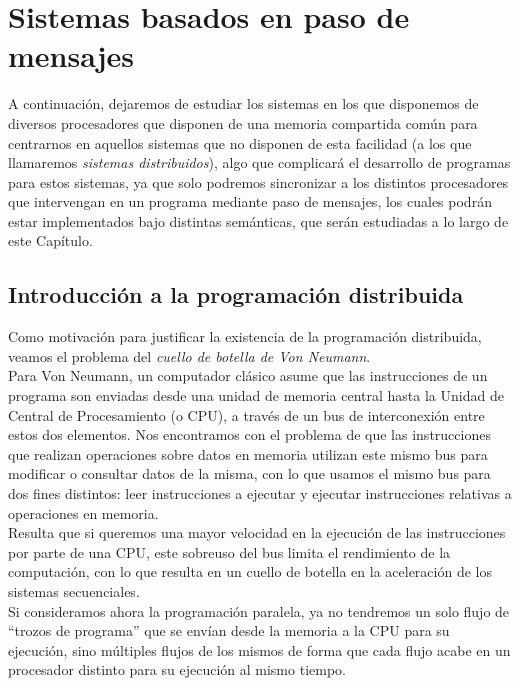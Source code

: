 \chapter{Sistemas basados en paso de mensajes}

A continuación, dejaremos de estudiar los sistemas en los que disponemos de diversos procesadores que disponen de una memoria compartida común para centrarnos en aquellos sistemas que no disponen de esta facilidad (a los que llamaremos \textit{sistemas distribuidos}), algo que complicará el desarrollo de programas para estos sistemas, ya que solo podremos sincronizar a los distintos procesadores que intervengan en un programa mediante paso de mensajes, los cuales podrán estar implementados bajo distintas semánticas, que serán estudiadas a lo largo de este Capítulo.

\section{Introducción a la programación distribuida}
Como motivación para justificar la existencia de la programación distribuida, veamos el problema del \textit{cuello de botella de Von Neumann}.\\

Para Von Neumann, un computador clásico asume que las instrucciones de un programa son enviadas desde una unidad de memoria central hasta la Unidad de Central de Procesamiento (o CPU), a través de un bus de interconexión entre estos dos elementos. Nos encontramos con el problema de que las instrucciones que realizan operaciones sobre datos en memoria utilizan este mismo bus para modificar o consultar datos de la misma, con lo que usamos el mismo bus para dos fines distintos: leer instrucciones a ejecutar y ejecutar instrucciones relativas a operaciones en memoria.\\

Resulta que si queremos una mayor velocidad en la ejecución de las instrucciones por parte de una CPU, este sobreuso del bus limita el rendimiento de la computación, con lo que resulta en un cuello de botella en la aceleración de los sistemas secuenciales.\\

Si consideramos ahora la programación paralela, ya no tendremos un solo flujo de ``trozos de programa''  que se envían desde la memoria a la CPU para su ejecución, sino múltiples flujos de los mismos de forma que cada flujo acabe en un procesador distinto para su ejecución al mismo tiempo.

